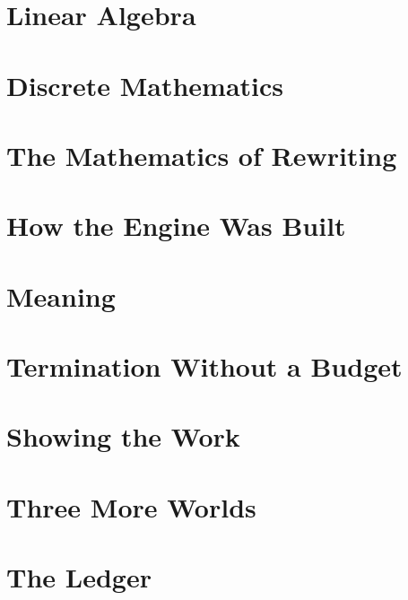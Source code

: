 \documentclass[12pt, a4paper, openright]{book}
\theoremstyle{thmstyle}
\theoremstyle{defstyle}
\begin{document}
\part{Linear Algebra}



\part{Discrete Mathematics}


\part{The Mathematics of Rewriting}

\part{How the Engine Was Built}


\part{Meaning}


\part{Termination Without a Budget}


\part{Showing the Work}


\part{Three More Worlds}



\part{The Ledger}


\appendix


\end{document}
